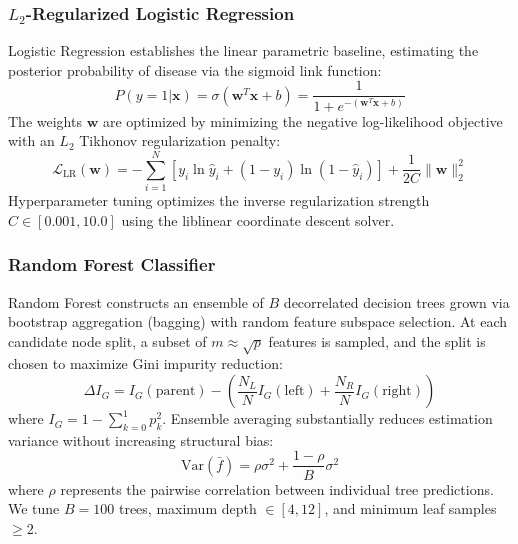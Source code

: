\documentclass[conference]{IEEEtran}
\begin{document}
\subsubsection{$L_2$-Regularized Logistic Regression}
Logistic Regression establishes the linear parametric baseline, estimating the posterior probability of disease via the sigmoid link function:
\begin{equation}
P(y=1|\mathbf{x}) = \sigma(\mathbf{w}^T \mathbf{x} + b) = \frac{1}{1 + e^{-(\mathbf{w}^T \mathbf{x} + b)}}
\end{equation}
The weights $\mathbf{w}$ are optimized by minimizing the negative log-likelihood objective with an $L_2$ Tikhonov regularization penalty:
\begin{equation}
\mathcal{L}_{\text{LR}}(\mathbf{w}) = -\sum_{i=1}^N \left[ y_i \ln \hat{y}_i + (1-y_i) \ln(1-\hat{y}_i) \right] + \frac{1}{2C} \|\mathbf{w}\|_2^2
\end{equation}
Hyperparameter tuning optimizes the inverse regularization strength $C \in [0.001, 10.0]$ using the liblinear coordinate descent solver.

\subsubsection{Random Forest Classifier}
Random Forest \cite{breiman2001} constructs an ensemble of $B$ decorrelated decision trees grown via bootstrap aggregation (bagging) with random feature subspace selection. At each candidate node split, a subset of $m \approx \sqrt{p}$ features is sampled, and the split is chosen to maximize Gini impurity reduction:
\begin{equation}
\Delta I_G = I_G(\text{parent}) - \left( \frac{N_L}{N} I_G(\text{left}) + \frac{N_R}{N} I_G(\text{right}) \right)
\end{equation}
where $I_G = 1 - \sum_{k=0}^1 p_k^2$. Ensemble averaging substantially reduces estimation variance without increasing structural bias:
\begin{equation}
\text{Var}(\bar{f}) = \rho \sigma^2 + \frac{1-\rho}{B} \sigma^2
\end{equation}
where $\rho$ represents the pairwise correlation between individual tree predictions. We tune $B=100$ trees, maximum depth $\in [4, 12]$, and minimum leaf samples $\ge 2$.
\end{document}
